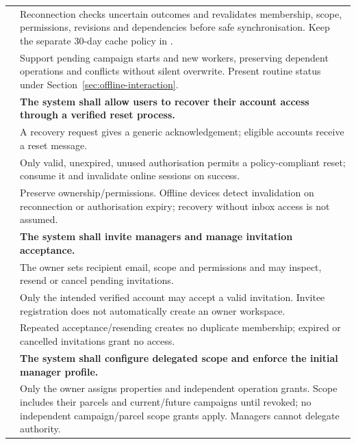 {\begin{longtable}{L{0.18}L{0.82}}
\label{ac:004:c} & Reconnection checks uncertain outcomes and revalidates membership, scope, permissions, revisions and dependencies before safe synchronisation. Keep the separate 30-day cache policy in .\\
\label{ac:004:d} & Support pending campaign starts and new workers, preserving dependent operations and conflicts without silent overwrite. Present routine status under Section~\ref{sec:offline-interaction}.\\
\midrule
{}
\label{fr:005}\textbf{} & \textbf{The system shall allow users to recover their account access through a verified reset process.}\\*
\label{ac:005:a} & A recovery request gives a generic acknowledgement; eligible accounts receive a reset message.\\
\label{ac:005:b} & Only valid, unexpired, unused authorisation permits a policy-compliant reset; consume it and invalidate online sessions on success.\\
\label{ac:005:c} & Preserve ownership/permissions. Offline devices detect invalidation on reconnection or authorisation expiry; recovery without inbox access is not assumed.\\
\midrule
{}
\label{fr:006}\textbf{} & \textbf{The system shall invite managers and manage invitation acceptance.}\\*
\label{ac:006:a} & The owner sets recipient email, scope and permissions and may inspect, resend or cancel pending invitations.\\
\label{ac:006:b} & Only the intended verified account may accept a valid invitation. Invitee registration does not automatically create an owner workspace.\\
\label{ac:006:c} & Repeated acceptance/resending creates no duplicate membership; expired or cancelled invitations grant no access.\\
\midrule
{}
\label{fr:007}\textbf{} & \textbf{The system shall configure delegated scope and enforce the initial manager profile.}\\*
\label{ac:007:a} & Only the owner assigns properties and independent operation grants. Scope includes their parcels and current/future campaigns until revoked; no independent campaign/parcel scope grants apply. Managers cannot delegate authority.\\

\end{longtable}}
